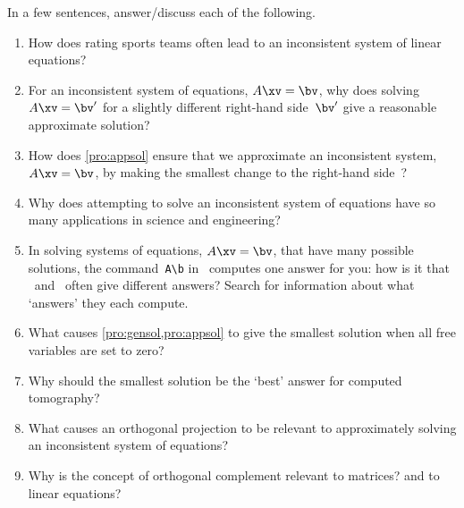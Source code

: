 \begin{exercise}  
In a few sentences, answer\slash discuss each of the following.
\begin{enumerate}
\item How does rating sports teams often lead to an inconsistent system of linear equations?

\item For an inconsistent system of equations, \(A\xv=\bv\), why does solving \(A\xv=\bv'\) for a slightly different right-hand side~\(\bv'\) give a reasonable approximate solution?

\item How does \cref{pro:appsol} ensure that we approximate an inconsistent system, \(A\xv=\bv\), by making the smallest change to the right-hand side~\bv?

\item Why does attempting to solve an inconsistent system of equations have so many applications in science and engineering?

\item In solving systems of equations, \(A\xv=\bv\), that have many possible solutions, the command~\verb|A\b| in \script\ computes one answer for you: how is it that \script[1]\ and \script[2]\ often give different answers?  Search for information about what `answers' they each compute.

\item What causes \cref{pro:gensol,pro:appsol} to give the smallest solution when all free variables are set to zero?

\item Why should the smallest solution be the `best' answer for computed tomography?

\item What causes an orthogonal projection to be relevant to approximately solving an inconsistent system of equations?


\item Why is the concept of orthogonal complement relevant to matrices?  and to linear equations?

\end{enumerate}
\end{exercise}

\begin{comment}%
why, what caused X?
how did X occur?
what-if? what-if-not?
how does X compare with Y?
what is the evidence for X?
why is X important?
\end{comment}


